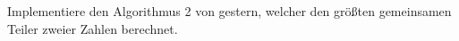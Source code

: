 \begin{aufg}
Implementiere den Algorithmus 2 von gestern, welcher den größten gemeinsamen Teiler zweier Zahlen berechnet.
\end{aufg}
